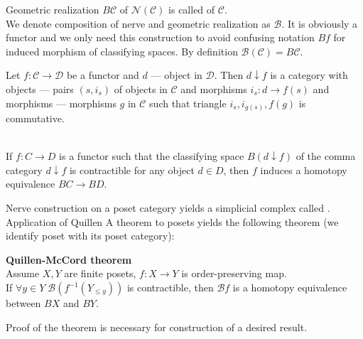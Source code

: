 \begin{definition}
  Geometric realization $B\mathcal{C}$ of $\mathcal{N}(\mathcal{C})$ is called  of $\mathcal{C}$.\\

  We denote composition of nerve and geometric realization as $\mathcal{B}$. It is obviously a functor and we only need this construction to avoid confusing notation $Bf$ for induced morphism of classifying spaces. By definition $\mathcal{B}(\mathcal{C}) = B\mathcal{C}$.
\end{definition}

\begin{definition}
  Let $f: \mathcal{C} \to \mathcal{D}$ be a functor and $d$ --- object in $\mathcal{D}$. Then  $d \downarrow f$ is a category with objects --- pairs $(s,i_s)$ of objects in $\mathcal{C}$ and morphisms $i_s : d \to f(s)$ and morphisms --- morphisms $g$ in $\mathcal{C}$ such that triangle $i_s, i_{g(s)}, f(g)$ is commutative.
\end{definition}

\begin{theorem} {\cite[Theorem A]{Quillen72}}\\
  If $f: C \to D$ is a functor such that the classifying space $B(d \downarrow f)$ of the comma category $d \downarrow f$ is contractible for any object $d \in D$, then $f$ induces a homotopy equivalence $BC \to BD$.
\end{theorem}

Nerve construction on a poset category yields a simplicial complex called . Application of Quillen A theorem to posets yields the following theorem (we identify poset with its poset category):

\begin{theorem} \textbf{Quillen-McCord theorem}\\
  Assume $X, Y$ are finite posets, $f : X \to Y$ is order-preserving map.\\
  If $\forall y \in Y\;\mathcal{B}(f^{-1}(Y_{\leqslant y}))$ is contractible, then $\mathcal{B}f$ is a homotopy equivalence between $BX$ and $BY$.\\
\end{theorem}

Proof of the theorem is necessary for construction of a desired result.\\
